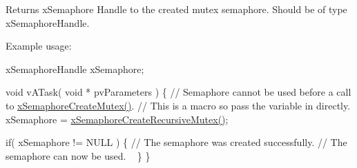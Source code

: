 \begin{DoxyReturn}{Returns}
x\+Semaphore Handle to the created mutex semaphore. Should be of type x\+Semaphore\+Handle.
\end{DoxyReturn}
Example usage\+: 
\begin{DoxyPre}
xSemaphoreHandle xSemaphore;\end{DoxyPre}



\begin{DoxyPre}void vATask( void * pvParameters )
\{
   // Semaphore cannot be used before a call to \mbox{\hyperlink{semphr_8h_aa6a00aa9b91a9e5b3ebe4ae1c3f115c6}{xSemaphoreCreateMutex()}}.
   // This is a macro so pass the variable in directly.
   xSemaphore = \mbox{\hyperlink{semphr_8h_a1bbc843be5a41ea83d2693b2189fc0f8}{xSemaphoreCreateRecursiveMutex()}};\end{DoxyPre}



\begin{DoxyPre}   if( xSemaphore != NULL )
   \{
       // The semaphore was created successfully.
       // The semaphore can now be used.  
~\newline
   \}
\}
\end{DoxyPre}
 